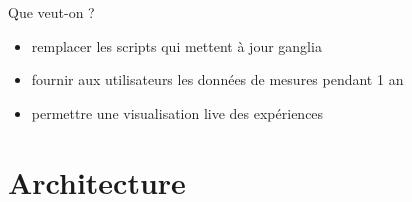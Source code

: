\documentclass{beamer}
\begin{document}
\begin{frame}{Que veut-on ?}
\begin{itemize}
  \item remplacer les scripts qui mettent à jour ganglia
  \item fournir aux utilisateurs les données de mesures pendant 1 an
  \item permettre une visualisation live des expériences
\end{itemize}
\end{frame}



\section{Architecture}
\frame{\tableofcontents[currentsection]}
\end{document}

